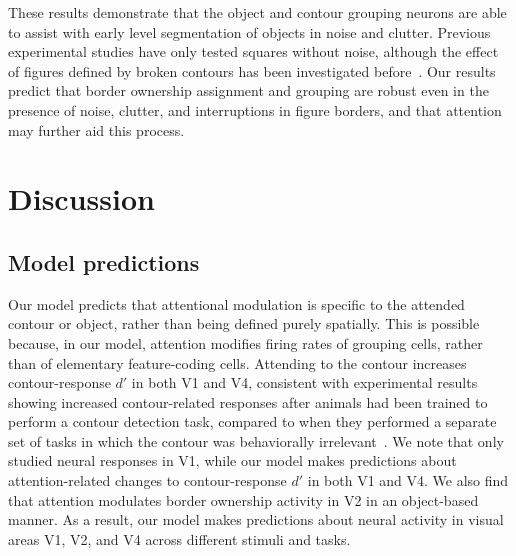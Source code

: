 These results demonstrate that the object and contour grouping neurons
are able to assist with early level segmentation of objects in noise
and clutter.  Previous experimental studies have only tested squares
without noise, although the effect of figures defined by broken contours has been investigated before~\citep{Zhang_vonderHeydt10}.
Our results predict that border ownership assignment and grouping are
robust even in the presence of noise,  clutter, and interruptions in figure borders, and that attention may further aid this process.

\section{Discussion}
\label{sec:discussion}


\subsection{Model predictions}

Our model predicts that attentional modulation is specific to the
attended contour or object, rather than being defined purely spatially. This is possible because, in our model, attention modifies firing rates of grouping cells, rather than of elementary feature-coding cells. Attending to the contour increases contour-response $d'$ in both V1 and V4, consistent with experimental results showing increased contour-related responses after animals had been trained to perform a contour detection task, compared to when they performed a separate set of tasks in which the contour was behaviorally irrelevant~\citep{Li_etal08a}. We note that \cite{Li_etal08a} only studied neural responses in V1, while our model makes predictions about attention-related changes to contour-response $d'$ in both V1 and V4.  We also find that attention modulates border ownership activity in V2 in an object-based manner. As a result, our model makes predictions about neural activity in visual areas V1, V2, and V4 across different stimuli and tasks.

